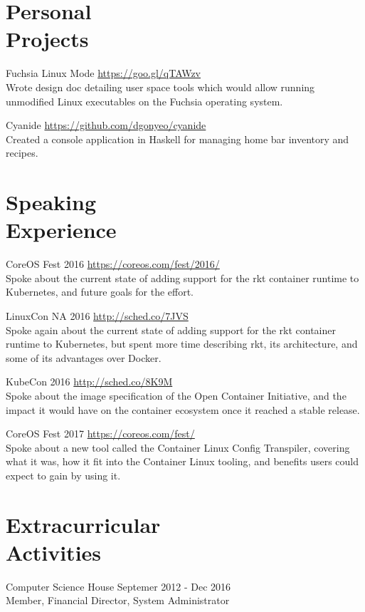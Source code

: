 \documentclass[letterpaper,margin,line,11pt]{resume}
\newcommand{\rurl}[1]{\hfill {\footnotesize \url{#1}}}
\begin{document}
\begin{resume}
\section{\mysidestyle Personal \\ Projects}
    \begin{compactdesc}
        \item[Fuchsia Linux Mode] \rurl{https://goo.gl/qTAWzv} \\
            Wrote design doc detailing user space tools which would allow
            running unmodified Linux executables on the Fuchsia operating
            system.
        \item[Cyanide] \rurl{https://github.com/dgonyeo/cyanide} \\
            Created a console application in Haskell for managing home bar
            inventory and recipes.
    \end{compactdesc}

\section{\mysidestyle Speaking \\ Experience}
    \begin{compactdesc}
        \item[CoreOS Fest 2016] \rurl{https://coreos.com/fest/2016/} \\
            Spoke about the current state of adding support for the rkt
            container runtime to Kubernetes, and future goals for the effort.
        \item[LinuxCon NA 2016] \rurl{http://sched.co/7JVS} \\
            Spoke again about the current state of adding support for the rkt
            container runtime to Kubernetes, but spent more time describing rkt,
            its architecture, and some of its advantages over Docker.
        \item[KubeCon 2016] \rurl{http://sched.co/8K9M} \\
            Spoke about the image specification of the Open Container
            Initiative, and the impact it would have on the container ecosystem
            once it reached a stable release.
        \item[CoreOS Fest 2017] \rurl{https://coreos.com/fest/} \\
            Spoke about a new tool called the Container Linux Config Transpiler,
            covering what it was, how it fit into the Container Linux tooling,
            and benefits users could expect to gain by using it.
    \end{compactdesc}

\section{\mysidestyle Extracurricular \\ Activities}
    \begin{compactdesc}
        \item[Computer Science House] \hfill Septemer 2012 - Dec 2016 \\
            Member, Financial Director, System Administrator
    \end{compactdesc}

\end{resume}
\end{document}
